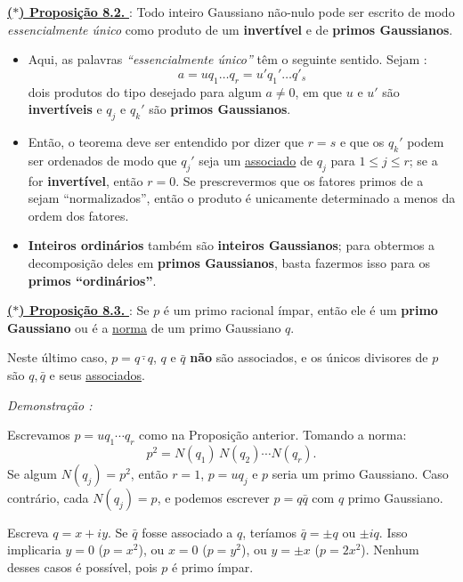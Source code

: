     \underline{\underline{ \textbf{\textcolor{cinzaEscuro}{($\ast$) Proposição 8.2.}} }} : Todo inteiro Gaussiano não-nulo pode ser escrito de modo 
    \emph{essencialmente único} como produto de um \textbf{invertível} e de \textbf{primos Gaussianos}.

    \begin{itemize}[left=0.5cm, align=left, nosep]
        \item Aqui, as palavras \textit{“essencialmente único”} têm o seguinte sentido. Sejam :
            \[
            a = uq_1 \ldots q_r = u'q_1' \ldots q'_s
            \]
            dois produtos do tipo desejado para algum $a \neq 0$, em que $u$ e $u'$ são 
            \textbf{invertíveis} e $q_j$ e $q_k'$ são \textbf{primos Gaussianos}. 

        \item Então, o teorema deve ser entendido por dizer que $r = s$ e que os $q_k'$ podem ser ordenados de
        modo que $q_j'$ seja um \underline{associado} de $q_j$ para $1 \leq j \leq r$; se a for \textbf{invertível}, então $r = 0$. 
        Se prescrevermos que os fatores primos de a sejam “normalizados”, então o produto é unicamente determinado a menos da
        ordem dos fatores.

        \item \textbf{Inteiros ordinários} também são \textbf{inteiros Gaussianos}; para obtermos a decomposição deles em \textbf{primos
        Gaussianos}, basta fazermos isso para os \textbf{primos “ordinários”}.
    \end{itemize}

    \underline{\underline{\textbf{($\ast$) Proposição 8.3. }}} : Se $p$ é um primo racional ímpar, então ele é um \textbf{primo Gaussiano} ou é a \underline{norma} de um primo Gaussiano $q$.  

    Neste último caso, $p = q\bar \cdot {q}$, $q$ e $\bar{q}$ \textbf{não} são associados, e os únicos divisores de $p$ são $q, \bar{q}$ e seus \underline{associados}.

    \textit{Demonstração : }

    Escrevamos $p = u q_1 \cdots q_r$ como na Proposição anterior.  
    Tomando a norma:
    \[
    p^2 = N(q_1)\,N(q_2)\cdots N(q_r).
    \]
    Se algum $N(q_j) = p^2$, então $r=1$, $p = u q_j$ e $p$ seria um primo Gaussiano.  
    Caso contrário, cada $N(q_j) = p$, e podemos escrever $p = q\bar{q}$ com $q$ primo Gaussiano.  

    Escreva $q = x+iy$.  
    Se $\bar{q}$ fosse associado a $q$, teríamos $\bar{q} = \pm q$ ou $\pm iq$.  
    Isso implicaria $y=0$ ($p=x^2$), ou $x=0$ ($p=y^2$), ou $y=\pm x$ ($p=2x^2$).  
    Nenhum desses casos é possível, pois $p$ é primo ímpar.

